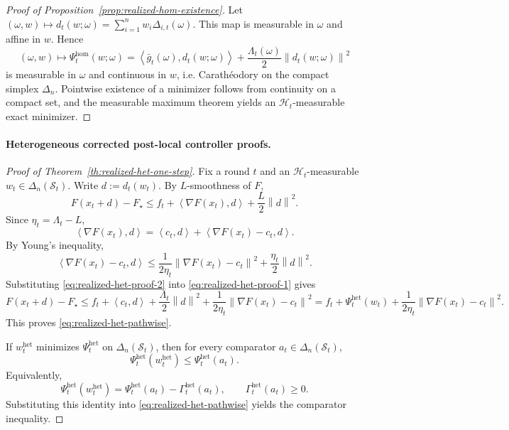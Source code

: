 \documentclass{article}
\theoremstyle{definition}
\newcommand{\norm}[1]{\left\lVert #1\right\rVert}
\newcommand{\ip}[2]{\left\langle #1,#2\right\rangle}
\begin{document}
\begin{proof}[Proof of Proposition~\ref{prop:realized-hom-existence}]
Let $(\omega,w)\mapsto d_t(w;\omega)=\sum_{i=1}^n w_i\Delta_{i,t}(\omega)$.
This map is measurable in $\omega$ and affine in $w$. Hence
\[
(\omega,w)\mapsto
\Psi_t^{\mathrm{hom}}(w;\omega)
=
\ip{\bar g_t(\omega)}{d_t(w;\omega)}
+
\frac{\Lambda_t(\omega)}{2}\norm{d_t(w;\omega)}^2
\]
is measurable in $\omega$ and continuous in $w$, i.e. Carath\'eodory on the compact simplex
$\Delta_n$. Pointwise existence of a minimizer follows from continuity on a compact set, and the
measurable maximum theorem yields an $\mathcal H_t$-measurable exact minimizer.
\end{proof}
\paragraph{Heterogeneous corrected post-local controller proofs.}

\begin{proof}[Proof of Theorem~\ref{th:realized-het-one-step}]
Fix a round $t$ and an $\mathcal H_t$-measurable $w_t\in\Delta_n(\mathcal S_t)$. Write $d:=d_t(w_t)$.
By $L$-smoothness of $F$,
\begin{equation}
F(x_t+d)-F_\star
\le
f_t+\ip{\nabla F(x_t)}{d}+\frac{L}{2}\norm{d}^2.
\label{eq:realized-het-proof-1}\end{equation}
Since $\eta_t=\Lambda_t-L$,
\[
\ip{\nabla F(x_t)}{d}
=
\ip{c_t}{d}+\ip{\nabla F(x_t)-c_t}{d}.
\]
By Young's inequality,
\begin{equation}
\ip{\nabla F(x_t)-c_t}{d}
\le
\frac{1}{2\eta_t}\norm{\nabla F(x_t)-c_t}^2
+
\frac{\eta_t}{2}\norm{d}^2.
\label{eq:realized-het-proof-2}\end{equation}
Substituting \eqref{eq:realized-het-proof-2} into \eqref{eq:realized-het-proof-1} gives
\[
F(x_t+d)-F_\star
\le
f_t+\ip{c_t}{d}+\frac{\Lambda_t}{2}\norm{d}^2+\frac{1}{2\eta_t}\norm{\nabla F(x_t)-c_t}^2
=
f_t+\Psi_t^{\mathrm{het}}(w_t)+\frac{1}{2\eta_t}\norm{\nabla F(x_t)-c_t}^2.
\]
This proves \eqref{eq:realized-het-pathwise}.

If $w_t^{\mathrm{het}}$ minimizes $\Psi_t^{\mathrm{het}}$ on $\Delta_n(\mathcal S_t)$, then for every
comparator $a_t\in\Delta_n(\mathcal S_t)$,
\[
\Psi_t^{\mathrm{het}}(w_t^{\mathrm{het}})
\le
\Psi_t^{\mathrm{het}}(a_t).
\]
Equivalently,
\[
\Psi_t^{\mathrm{het}}(w_t^{\mathrm{het}})
=
\Psi_t^{\mathrm{het}}(a_t)-\Gamma_t^{\mathrm{het}}(a_t),
\qquad
\Gamma_t^{\mathrm{het}}(a_t)\ge 0.
\]
Substituting this identity into \eqref{eq:realized-het-pathwise} yields the comparator inequality.
\end{proof}
\end{document}
